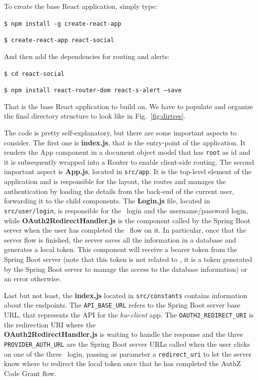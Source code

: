 \noindent To create the base React application, simply type:

  \texttt{\$ npm install -g create-react-app}
  
  \texttt{\$ create-react-app react-social}

\noindent And then add the dependencies for routing and alerts:

  \texttt{\$ cd react-social}
  
  \texttt{\$ npm install react-router-dom react-s-alert --save}

\noindent That is the base React application to build on. We have to populate and organize the final directory structure to look like in Fig.~\ref{fig:dirtree}.

The code is pretty self-explanatory, but there are some important aspects to consider. The first one is \textbf{index.js}, that is the entry-point of the application. It renders the App component in a document object model that has \texttt{root} as id and it is subsequently wrapped into a Router to enable client-side routing. The second important aspect is \textbf{App.js}, located in \texttt{src/app}. It is the top-level element of the application and is responsible for the layout, the routes and manages the authentication by loading the details from the back-end of the current user, forwarding it to the child components. The \textbf{Login.js} file, located in \texttt{src/user/login}, is responsible for the \oauth\ login and the username/password login, while \textbf{OAuth2RedirectHandler.js} is the component called by the Spring Boot server when the user has completed the \oauth\ flow on it. In particular, once that the server flow is finished, the server saves all the information in a database and generates a local token. This component will receive a bearer token from the Spring Boot server (note that this token is not related to \oauth, it is a token generated by the Spring Boot server to manage the access to the database information) or an error otherwise.

Last but not least, the \textbf{index.js} located in \texttt{src/constants} contains information about the endpoints. The \texttt{API\_BASE\_URL} refers to the Spring Boot server base URL, that represents the API for the \textit{hw-client} app. The \texttt{OAUTH2\_REDIRECT\_URI} is the redirection URI where the \\ \textbf{OAuth2RedirectHandler.js} is waiting to handle the response and the three \texttt{PROVIDER\_AUTH\_URL} are the Spring Boot server URLs called when the user clicks on one of the three \oauth\ login, passing as parameter a \texttt{redirect\_uri} to let the server know where to redirect the local token once that he has completed the AuthZ Code Grant flow. 


